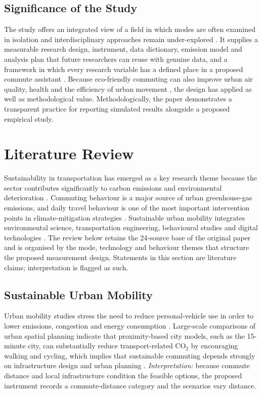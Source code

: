 \documentclass[11pt,a4paper]{article}
\begin{document}
\subsection{Significance of the Study}
The study offers an integrated view of a field in which modes are often examined in isolation and
interdisciplinary approaches remain under-explored \citep{eslami2025,kashem2025}. It supplies a
measurable research design, instrument, data dictionary, emission model and analysis plan that future
researchers can reuse with genuine data, and a framework in which every research variable has a
defined place in a proposed commute assistant \citep{liu2025}. Because eco-friendly commuting can
also improve urban air quality, health and the efficiency of urban movement \citep{cui2024}, the
design has applied as well as methodological value. Methodologically, the paper demonstrates a
transparent practice for reporting simulated results alongside a proposed empirical study.

\section{Literature Review}
\label{sec:lit}

Sustainability in transportation has emerged as a key research theme because the sector contributes
significantly to carbon emissions and environmental deterioration \citep{eslami2025,ouyang2025}.
Commuting behaviour is a major source of urban greenhouse-gas emissions, and daily travel behaviour
is one of the most important intervention points in climate-mitigation strategies \citep{eslami2025}.
Sustainable urban mobility integrates environmental science, transportation engineering, behavioural
studies and digital technologies \citep{ouyang2025}. The review below retains the 24-source base of
the original paper and is organised by the mode, technology and behaviour themes that structure the
proposed measurement design. Statements in this section are literature claims; interpretation is
flagged as such.

\subsection{Sustainable Urban Mobility}
Urban mobility studies stress the need to reduce personal-vehicle use in order to lower emissions,
congestion and energy consumption \citep{comi2024}. Large-scale comparisons of urban spatial planning
indicate that proximity-based city models, such as the 15-minute city, can substantially reduce
transport-related CO$_2$ by encouraging walking and cycling, which implies that sustainable commuting
depends strongly on infrastructure design and urban planning \citep{marzolla2025}.
\textit{Interpretation:} because commute distance and local infrastructure condition the feasible
options, the proposed instrument records a commute-distance category and the scenarios vary distance.
\end{document}
